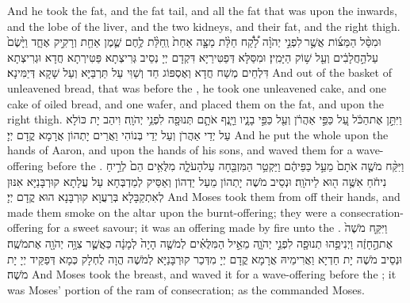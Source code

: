 {And he took the fat, and the fat tail, and all the fat that was upon the inwards, and the lobe of the liver, and the two kidneys, and their fat, and the right thigh.}{}
{וּמִסַּ֨ל הַמַּצּ֜וֹת אֲשֶׁ֣ר \legarmeh  לִפְנֵ֣י יְהֹוָ֗ה לָ֠קַ֠ח חַלַּ֨ת מַצָּ֤ה אַחַת֙ וְֽחַלַּ֨ת לֶ֥חֶם שֶׁ֛מֶן אַחַ֖ת וְרָקִ֣יק אֶחָ֑ד וַיָּ֙שֶׂם֙ עַל\maqqaf הַ֣חֲלָבִ֔ים וְעַ֖ל שׁ֥וֹק הַיָּמִֽין׃}
{וּמִסַּלָּא דְּפַטִּירַיָּא דִּקְדָם יְיָ נְסֵיב גְּרִיצְתָא פַּטִּירְתָא חֲדָא וּגְרִיצְתָא דִּלְחֵים מְשַׁח חֲדָא וְאֶסְפּוֹג חַד וְשַׁוִּי עַל תַּרְבַּיָּא וְעַל שָׁקָא דְּיַמִּינָא׃}
{And out of the basket of unleavened bread, that was before the \lord, he took one unleavened cake, and one cake of oiled bread, and one wafer, and placed them on the fat, and upon the right thigh.}{}
{וַיִּתֵּ֣ן אֶת\maqqaf הַכֹּ֔ל עַ֚ל כַּפֵּ֣י אַהֲרֹ֔ן וְעַ֖ל כַּפֵּ֣י בָנָ֑יו וַיָּ֧נֶף אֹתָ֛ם תְּנוּפָ֖ה לִפְנֵ֥י יְהֹוָֽה׃}
{וִיהַב יָת כּוֹלָא עַל יְדֵי אַהֲרֹן וְעַל יְדֵי בְּנוֹהִי וַאֲרֵים יָתְהוֹן אֲרָמָא קֳדָם יְיָ׃}
{And he put the whole upon the hands of Aaron, and upon the hands of his sons, and waved them for a wave-offering before the \lord.}{}
{וַיִּקַּ֨ח מֹשֶׁ֤ה אֹתָם֙ מֵעַ֣ל כַּפֵּיהֶ֔ם וַיַּקְטֵ֥ר הַמִּזְבֵּ֖חָה עַל\maqqaf הָעֹלָ֑ה מִלֻּאִ֥ים הֵם֙ לְרֵ֣יחַ נִיחֹ֔חַ אִשֶּׁ֥ה ה֖וּא לַיהֹוָֽה׃}
{וּנְסֵיב מֹשֶׁה יָתְהוֹן מֵעַל יַדְהוֹן וְאַסֵּיק לְמַדְבְּחָא עַל עֲלָתָא קוּרְבָּנַיָּא אִנּוּן לְאִתְקַבָּלָא בְּרַעֲוָא קוּרְבָּנָא הוּא קֳדָם יְיָ׃}
{And Moses took them from off their hands, and made them smoke on the altar upon the burnt-offering; they were a consecration-offering for a sweet savour; it was an offering made by fire unto the \lord.}{}
{וַיִּקַּ֤ח מֹשֶׁה֙ אֶת\maqqaf הֶ֣חָזֶ֔ה וַיְנִיפֵ֥הוּ תְנוּפָ֖ה לִפְנֵ֣י יְהֹוָ֑ה מֵאֵ֣יל הַמִּלֻּאִ֗ים לְמֹשֶׁ֤ה הָיָה֙ לְמָנָ֔ה כַּאֲשֶׁ֛ר צִוָּ֥ה יְהֹוָ֖ה אֶת\maqqaf מֹשֶֽׁה׃}
{וּנְסֵיב מֹשֶׁה יָת חַדְיָא וַאֲרִימֵיהּ אֲרָמָא קֳדָם יְיָ מִדְּכַר קוּרְבָּנַיָּא לְמֹשֶׁה הֲוָה לֻחְלָק כְּמָא דְּפַקֵּיד יְיָ יָת מֹשֶׁה׃}
{And Moses took the breast, and waved it for a wave-offering before the \lord; it was Moses’ portion of the ram of consecration; as the \lord\space commanded Moses.}{}
